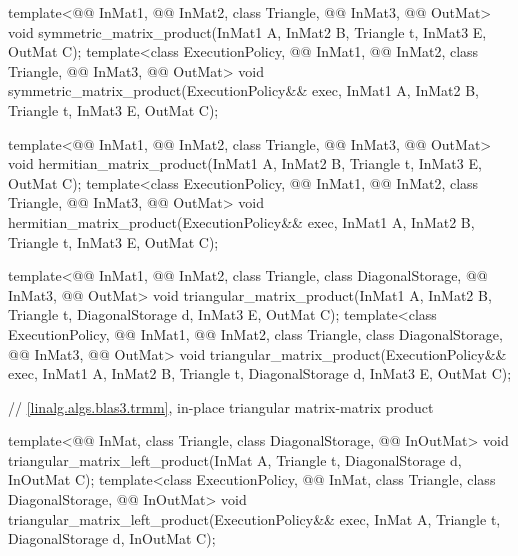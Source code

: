\begin{codeblock}
{  template<@@ InMat1, @@ InMat2, class Triangle, @@ InMat3,
           @@ OutMat>
    void symmetric_matrix_product(InMat1 A, InMat2 B, Triangle t, InMat3 E, OutMat C);
  template<class ExecutionPolicy,
           @@ InMat1, @@ InMat2, class Triangle, @@ InMat3,
           @@ OutMat>
    void symmetric_matrix_product(ExecutionPolicy&& exec,
                                  InMat1 A, InMat2 B, Triangle t, InMat3 E, OutMat C);

  template<@@ InMat1, @@ InMat2, class Triangle, @@ InMat3,
           @@ OutMat>
    void hermitian_matrix_product(InMat1 A, InMat2 B, Triangle t, InMat3 E, OutMat C);
  template<class ExecutionPolicy,
           @@ InMat1, @@ InMat2, class Triangle, @@ InMat3,
           @@ OutMat>
    void hermitian_matrix_product(ExecutionPolicy&& exec,
                                  InMat1 A, InMat2 B, Triangle t, InMat3 E, OutMat C);

  template<@@ InMat1, @@ InMat2, class Triangle, class DiagonalStorage,
           @@ InMat3, @@ OutMat>
    void triangular_matrix_product(InMat1 A, InMat2 B, Triangle t, DiagonalStorage d, InMat3 E,
                                   OutMat C);
  template<class ExecutionPolicy,
           @@ InMat1, @@ InMat2, class Triangle, class DiagonalStorage,
           @@ InMat3, @@ OutMat>
    void triangular_matrix_product(ExecutionPolicy&& exec,
                                   InMat1 A, InMat2 B, Triangle t, DiagonalStorage d, InMat3 E,
                                   OutMat C);

  // \ref{linalg.algs.blas3.trmm}, in-place triangular matrix-matrix product

  template<@@ InMat, class Triangle, class DiagonalStorage, @@ InOutMat>
    void triangular_matrix_left_product(InMat A, Triangle t, DiagonalStorage d, InOutMat C);
  template<class ExecutionPolicy,
           @@ InMat, class Triangle, class DiagonalStorage, @@ InOutMat>
    void triangular_matrix_left_product(ExecutionPolicy&& exec,
                                        InMat A, Triangle t, DiagonalStorage d, InOutMat C);

}
\end{codeblock}
